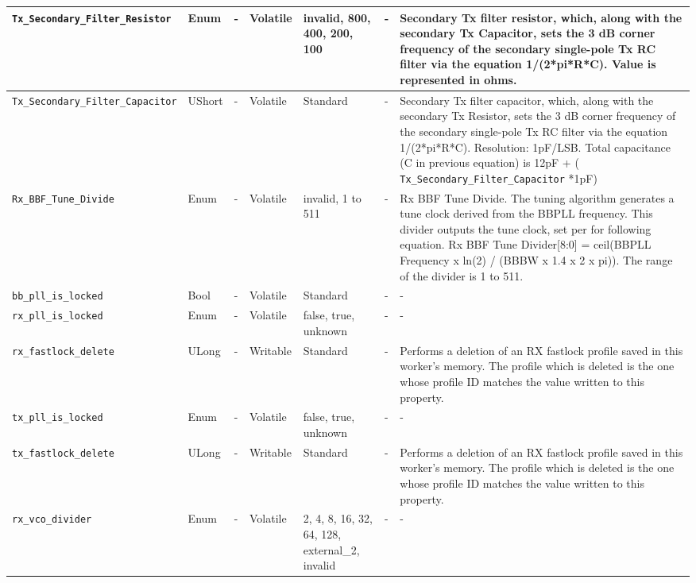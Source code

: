 \documentclass{article}
\begin{document}
\begin{landscape}
\begin{scriptsize}
\begin{longtable}{|p{3.6cm}|p{8.1cm}|p{1.4cm}|p{1.3cm}|p{1.4cm}|p{2.5cm}|p{3.6cm}|}
			\hline
			\verb+Tx_Secondary_Filter_Resistor+ & Enum & - & Volatile & invalid, 800, 400, 200, 100 & - & Secondary Tx filter resistor, which, along with the secondary Tx Capacitor, sets the 3 dB corner frequency of the secondary single-pole Tx RC filter via the equation 1/(2*pi*R*C). Value is represented in ohms. \\
			\hline
			\verb+Tx_Secondary_Filter_Capacitor+ & UShort & - & Volatile & Standard & - & 
Secondary Tx filter capacitor, which, along with the secondary Tx Resistor, sets the 3 dB corner frequency of the secondary single-pole Tx RC filter via the equation 1/(2*pi*R*C). Resolution: 1pF/LSB. Total capacitance (C in previous equation) is 12pF + ( \verb+Tx_Secondary_Filter_Capacitor+ *1pF) \\
			\hline
			\verb+Rx_BBF_Tune_Divide+ & Enum & - & Volatile & invalid, 1 to 511 & - &
                                      Rx BBF Tune Divide. The
                                        tuning algorithm generates a tune clock
                                        derived from the BBPLL frequency. This
                                        divider outputs the tune clock, set per
                                        for following equation. Rx BBF Tune
                                        Divider[8:0] = ceil(BBPLL Frequency x
                                        ln(2) / (BBBW x 1.4 x 2 x pi)). The
                                        range of the divider is 1 to 511. \\
			\hline
			\verb+bb_pll_is_locked+ & Bool & - & Volatile & Standard & - & - \\
			\hline
			\verb+rx_pll_is_locked+ & Enum & - & Volatile & false, true, unknown & - & - \\
			\hline
			\verb+rx_fastlock_delete+ & ULong & - & Writable & Standard & - & Performs a deletion of an RX fastlock profile saved in this worker's memory. The profile which is deleted is the one whose profile ID matches the value written to this property. \\
			\hline
			\verb+tx_pll_is_locked+ & Enum & - & Volatile & false, true, unknown & - & - \\
			\hline
			\verb+tx_fastlock_delete+ & ULong & - & Writable & Standard & - & Performs a deletion of an RX fastlock profile saved in this worker's memory. The profile which is deleted is the one whose profile ID matches the value written to this property. \\
			\hline
			\verb+rx_vco_divider+ & Enum & - & Volatile & 2, 4, 8, 16, 32, 64, 128, external\_2, invalid & - & - \\

\end{longtable}
\end{scriptsize}
\end{landscape}
\end{document}
